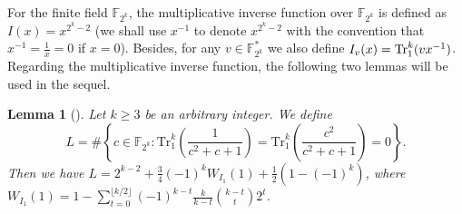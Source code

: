 \documentclass{article}
\newcommand{\F}{\mathbb{F}}
\newcommand{\0}{\textbf{0}}
\newcommand{\1}{\textbf{1}}
\theoremstyle{plain}
\newtheorem{lemma}{Lemma}
\begin{document}
    For the finite field $\F_{2^k}$, the multiplicative inverse function over $\F_{2^k}$ is defined as $I(x)=x^{2^k-2}$ (we shall use $x^{-1}$ to denote $x^{2^k-2}$ with the convention that $x^{-1}=\frac{1}{x}=0$ if $x=0$).
    Besides, for any $v\in\F_{2^k}^*$ we also define $I_v(x)=\Tr_1^k(vx^{-1})$.
    Regarding the multiplicative inverse function, the following two lemmas will be used in the sequel.

    \begin{lemma}[\cite{TangMM2022inversefunction}]\label{L:SumInv00}
        Let $k\geq 3$ be an arbitrary integer.
        We define
        $$L=\#\left\{c\in\F_{2^k}  :  \mathrm{Tr}_1^k\left(\frac{1}{c^2+c+1}\right)=\mathrm{Tr}_1^k\left(\frac{c^2}{c^2+c+1}\right)=0\right\}.$$
        Then we have $L=2^{k-2}+\frac{3}{4}(-1)^kW_{I_1}(1)+\frac{1}{2}\left(1-(-1)^k\right)$, where $W_{I_1}(1)=1-\sum_{t=0}^{\lfloor k/2\rfloor}(-1)^{k-t}\frac{k}{k-t}{{k-t}\choose {t}}2^t$.
    \end{lemma}

\end{document}
